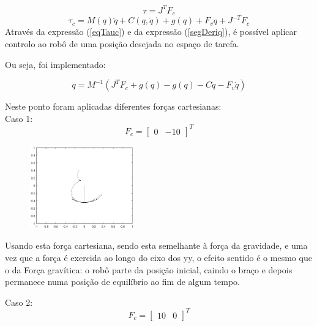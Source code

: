 \documentclass[a4paper,twocolumn,final,11pt]{article}
\let\oldref\ref
\renewcommand{\ref}[1]{(\oldref{#1})}
\begin{document}
\begin{equation}
       \tau = J^{T}F_c
\end{equation}
\begin{equation}
       \tau_c = M(q)\ddot{q} + C(q,\dot{q}) + g(q) + F_v\dot{q} + J^{-T}F_c
       \label{eqTauc}
\end{equation}
\linebreak
Através da expressão \ref{eqTauc} e da expressão \ref{segDeriq}, é possível aplicar controlo ao robô de uma posição desejada no espaço de tarefa.

Ou seja, foi implementado:

\begin{equation}
       \ddot{q}=M^{-1}(J^{T}F_c + g(q) - g(q) - C\dot{q} - F_v\dot{q})
\end{equation}

Neste ponto foram aplicadas diferentes forças cartesianas:
\\


Caso 1: \begin{equation} F_c = \begin{bmatrix}
0 & -10
\end{bmatrix}
^{T}
\end{equation}

\begin{figure}[H]
	\centering
	\includegraphics[width=0.4\textwidth]{6_f_0_menos10.eps}
	\caption{}
  \label{}
\end{figure}

Usando esta força cartesiana, sendo esta semelhante à força da gravidade, e uma vez que a força é exercida ao longo do eixo dos yy, o efeito sentido é o mesmo que o da Força gravítica: o robô parte da posição inicial, caindo o braço e depois permanece numa posição de equilíbrio ao fim de algum tempo.
\linebreak

Caso 2: \begin{equation} F_c = \begin{bmatrix}
10 & 0
\end{bmatrix}
^{T}
\end{equation}
\end{document}
